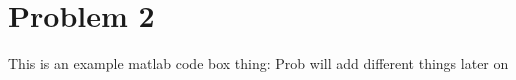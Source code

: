 \section*{Problem 2}
This is an example matlab code box thing:
Prob will add different things later on